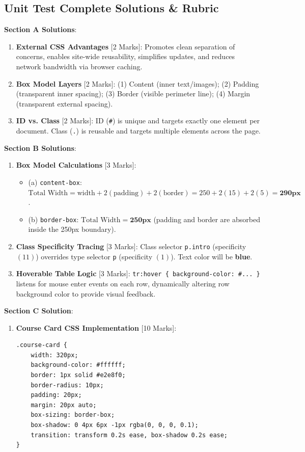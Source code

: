 \subsection{Unit Test Complete Solutions \& Rubric}

\begin{solutionbox}
\noindent\textbf{Section A Solutions}:
\begin{enumerate}
    \item \textbf{External CSS Advantages} [2 Marks]: Promotes clean separation of concerns, enables site-wide reusability, simplifies updates, and reduces network bandwidth via browser caching.
    \item \textbf{Box Model Layers} [2 Marks]: (1) Content (inner text/images); (2) Padding (transparent inner spacing); (3) Border (visible perimeter line); (4) Margin (transparent external spacing).
    \item \textbf{ID vs. Class} [2 Marks]: ID (\texttt{\#}) is unique and targets exactly one element per document. Class (\texttt{.}) is reusable and targets multiple elements across the page.
\end{enumerate}

\noindent\textbf{Section B Solutions}:
\begin{enumerate}[start=4]
    \item \textbf{Box Model Calculations} [3 Marks]:
    \begin{itemize}
        \item (a) \texttt{content-box}: $\text{Total Width} = \text{width} + 2(\text{padding}) + 2(\text{border}) = 250 + 2(15) + 2(5) = \mathbf{290\text{px}}$.
        \item (b) \texttt{border-box}: $\text{Total Width} = \mathbf{250\text{px}}$ (padding and border are absorbed inside the 250px boundary).
    \end{itemize}
    \item \textbf{Class Specificity Tracing} [3 Marks]: Class selector \texttt{p.intro} (specificity $(11)$) overrides type selector \texttt{p} (specificity $(1)$). Text color will be \textbf{blue}.
    \item \textbf{Hoverable Table Logic} [3 Marks]: \texttt{tr:hover \{ background-color: \#... \}} listens for mouse enter events on each row, dynamically altering row background color to provide visual feedback.
\end{enumerate}

\noindent\textbf{Section C Solution}:
\begin{enumerate}[start=7]
    \item \textbf{Course Card CSS Implementation} [10 Marks]:
\begin{lstlisting}[language=CSS3]
.course-card {
    width: 320px;
    background-color: #ffffff;
    border: 1px solid #e2e8f0;
    border-radius: 10px;
    padding: 20px;
    margin: 20px auto;
    box-sizing: border-box;
    box-shadow: 0 4px 6px -1px rgba(0, 0, 0, 0.1);
    transition: transform 0.2s ease, box-shadow 0.2s ease;
}


\end{lstlisting}
\end{enumerate}
\end{solutionbox}
